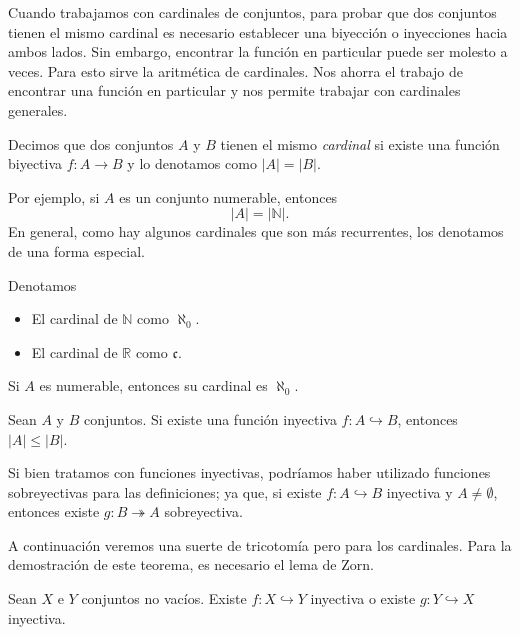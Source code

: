 Cuando trabajamos con cardinales de conjuntos, para probar que dos conjuntos tienen el mismo cardinal es necesario establecer una biyección o inyecciones hacia ambos lados. Sin embargo, encontrar la función en particular puede ser molesto a veces. Para esto sirve la aritmética de cardinales. Nos ahorra el trabajo de encontrar una función en particular y nos permite trabajar con cardinales generales.

\begin{definition}
	Decimos que dos conjuntos $A$ y $B$ tienen el mismo \emph{cardinal} si existe una función biyectiva $f: A \to  B$ y lo denotamos como $\lvert A \rvert = \lvert B \rvert$.
\end{definition}

Por ejemplo, si $A$ es un conjunto numerable, entonces
\begin{equation*}
	\lvert A \rvert = \lvert \mathbb{N} \rvert.
\end{equation*}
En general, como hay algunos cardinales que son más recurrentes, los denotamos de una forma especial.

\begin{definition}
	Denotamos
	\begin{itemize}
		\item El cardinal de $\mathbb{N}$ como $\aleph_0$.
		\item El cardinal de $\mathbb{R}$ como $\mathfrak{c}$.
	\end{itemize}
\end{definition}

\begin{remark}
	Si $A$ es numerable, entonces su cardinal es $\aleph_0$.
\end{remark}

\begin{definition}
	Sean $A$ y $B$ conjuntos. Si existe una función inyectiva $f: A \hookrightarrow B$, entonces $\lvert A \rvert \leq \lvert B \rvert$.
\end{definition}

Si bien tratamos con funciones inyectivas, podríamos haber utilizado funciones sobreyectivas para las definiciones; ya que, si existe $f: A \hookrightarrow B$ inyectiva y $A \neq \emptyset $, entonces existe $g: B \twoheadrightarrow A$ sobreyectiva.

A continuación veremos una suerte de tricotomía pero para los cardinales. Para la demostración de este teorema, es necesario el lema de Zorn.

\begin{theorem}
	Sean $X$ e $Y$ conjuntos no vacíos. Existe $f: X \hookrightarrow Y$ inyectiva o existe $g: Y \hookrightarrow X$ inyectiva.
\end{theorem}

